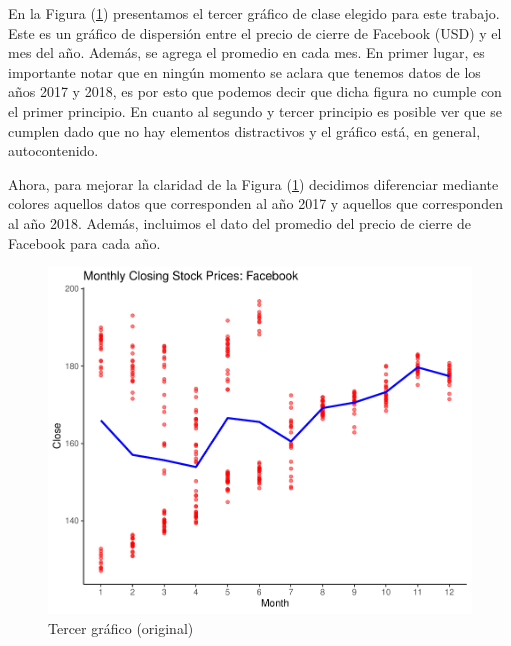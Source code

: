 \documentclass[12pt]{article}
\begin{document}
En la Figura (\ref{tercerooriginal}) presentamos el tercer gráfico de clase elegido para este trabajo. Este es un gráfico de dispersión entre el precio de cierre de Facebook (USD) y el mes del año. Además, se agrega el promedio en cada mes. En primer lugar, es importante notar que en ningún momento se aclara que tenemos datos de los años 2017 y 2018, es por esto que podemos decir que dicha figura no cumple con el primer principio. En cuanto al segundo y tercer principio es posible ver que se cumplen dado que no hay elementos distractivos y el gráfico está, en general, autocontenido. 

Ahora, para mejorar la claridad de la Figura (\ref{tercerooriginal}) decidimos diferenciar mediante colores aquellos datos que corresponden al año 2017 y aquellos que corresponden al año 2018. Además, incluimos el dato del promedio del precio de cierre de Facebook para cada año. 


\begin{figure}[htbp]
    \centering
\includegraphics[width = \textwidth]{graficos/tercergrafico_original_mod.pdf}
    \caption{Tercer gráfico (original)}
    \label{tercerooriginal}
\end{figure}
\end{document}
